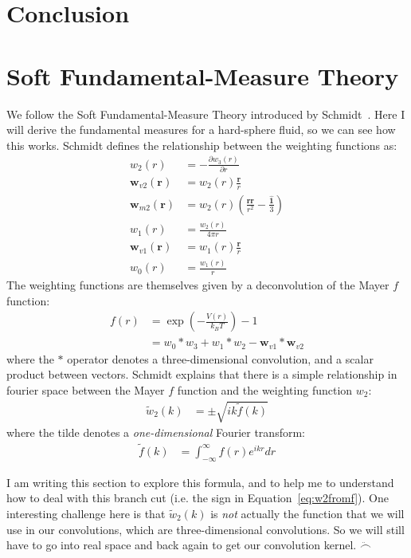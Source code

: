 \documentclass[letterpaper,twocolumn,amsmath,amssymb,prb]{revtex4-1}
\newcommand{\rr}{\textbf{r}}
\begin{document}
\section{Conclusion}

\appendix

\section{Soft Fundamental-Measure Theory}

We follow the Soft Fundamental-Measure Theory introduced by
Schmidt~\cite{schmidt2000fluid}.  Here I will derive the fundamental
measures for a hard-sphere fluid, so we can see how this works.
Schmidt defines the relationship between the weighting functions as:
\begin{align}
  w_2(r) &= -\frac{\partial w_3(r)}{\partial r} \\
  \mathbf{w}_{v2}(\rr) &= w_2(r)\frac{\rr}{r} \\
  \mathbf{w}_{m2}(\rr) &= w_2(r)\left( \frac{\rr \rr}{r^2}
                              - \frac{\mathbf{\hat{1}}}{3} \right) \\
  w_1(r) &= \frac{w_2(r)}{4\pi r} \\
  \mathbf{w}_{v1}(\rr) &= w_1(r) \frac{\rr}{r} \\
  w_0(r) &= \frac{w_1(r)}{r}
\end{align}
The weighting functions are themselves given by a deconvolution of the
Mayer $f$ function:
\begin{align}
  f(r) &= \exp\left(-\frac{V(r)}{k_BT}\right) - 1 \\
  &= w_0 * w_3 + w_1 * w_2 - \mathbf{w}_{v1} * \mathbf{w}_{v2}
\end{align}
where the $*$ operator denotes a three-dimensional convolution, and a
scalar product between vectors.  Schmidt explains that there is a
simple relationship in fourier space between the Mayer $f$ function
and the weighting function $w_2$:
\begin{align}
  \tilde{w}_2(k) &= \pm \sqrt{ik\tilde{f}(k)} \label{eq:w2fromf}
\end{align}
where the tilde denotes a \emph{one-dimensional} Fourier transform:
\begin{align}
  \tilde{f}(k) &= \int_{-\infty}^\infty f(r) e^{ikr} dr
\end{align}

I am writing this section to explore this formula, and to help me to
understand how to deal with this branch cut (i.e. the sign in
Equation~\ref{eq:w2fromf}).  One interesting challenge here is that
$\tilde{w}_2(k)$ is \emph{not} actually the function that we will use
in our convolutions, which are three-dimensional convolutions.  So we
will still have to go into real space and back again to get our
convolution kernel.  $\ddot\frown$
\end{document}
